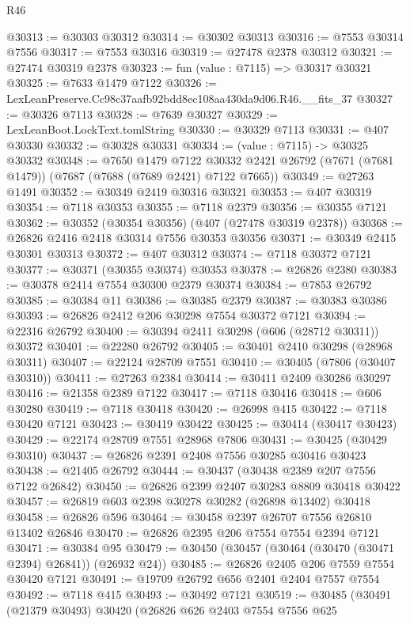 \begin{lexlean}{R46}
\begin{coremodule}
@30313 := @30303 @30312
@30314 := @30302 @30313
@30316 := @7553 @30314 @7556
@30317 := @7553 @30316
@30319 := @27478 @2378 @30312
@30321 := @27474 @30319 @2378
@30323 := fun (value : @7115) => @30317 @30321
@30325 := @7633 @1479 @7122
@30326 := LexLeanPreserve.Cc98c37aafb92bdd8ec108aa430da9d06.R46.__fits_37
@30327 := @30326 @7113
@30328 := @7639 @30327
@30329 := LexLeanBoot.LockText.tomlString
@30330 := @30329 @7113
@30331 := @407 @30330
@30332 := @30328 @30331
@30334 := (value : @7115) -> @30325 @30332
@30348 := @7650
    @1479
    @7122
    @30332
    @2421
    @26792
    (@7671 (@7681 @1479))
    (@7687 (@7688 (@7689 @2421) @7122 @7665))
@30349 := @27263 @1491
@30352 := @30349 @2419 @30316 @30321
@30353 := @407 @30319
@30354 := @7118 @30353
@30355 := @7118 @2379
@30356 := @30355 @7121
@30362 := @30352 (@30354 @30356) (@407 (@27478 @30319 @2378))
@30368 := @26826 @2416 @2418 @30314 @7556 @30353 @30356
@30371 := @30349 @2415 @30301 @30313
@30372 := @407 @30312
@30374 := @7118 @30372 @7121
@30377 := @30371 (@30355 @30374) @30353
@30378 := @26826 @2380
@30383 := @30378 @2414 @7554 @30300 @2379 @30374
@30384 := @7853 @26792
@30385 := @30384 @11
@30386 := @30385 @2379
@30387 := @30383 @30386
@30393 := @26826 @2412 @206 @30298 @7554 @30372 @7121
@30394 := @22316 @26792
@30400 := @30394 @2411 @30298 (@606 (@28712 @30311)) @30372
@30401 := @22280 @26792
@30405 := @30401 @2410 @30298 (@28968 @30311)
@30407 := @22124 @28709 @7551
@30410 := @30405 (@7806 (@30407 @30310))
@30411 := @27263 @2384
@30414 := @30411 @2409 @30286 @30297
@30416 := @21358 @2389 @7122
@30417 := @7118 @30416
@30418 := @606 @30280
@30419 := @7118 @30418
@30420 := @26998 @415
@30422 := @7118 @30420 @7121
@30423 := @30419 @30422
@30425 := @30414 (@30417 @30423)
@30429 := @22174 @28709 @7551 @28968 @7806
@30431 := @30425 (@30429 @30310)
@30437 := @26826 @2391 @2408 @7556 @30285 @30416 @30423
@30438 := @21405 @26792
@30444 := @30437 (@30438 @2389 @207 @7556 @7122 @26842)
@30450 := @26826 @2399 @2407 @30283 @8809 @30418 @30422
@30457 := @26819 @603 @2398 @30278 @30282 (@26898 @13402) @30418
@30458 := @26826 @596
@30464 := @30458 @2397 @26707 @7556 @26810 @13402 @26846
@30470 := @26826 @2395 @206 @7554 @7554 @2394 @7121
@30471 := @30384 @95
@30479 := @30450 (@30457 (@30464 (@30470 (@30471 @2394) @26841)) (@26932 @24))
@30485 := @26826 @2405 @206 @7559 @7554 @30420 @7121
@30491 := @19709 @26792 @656 @2401 @2404 @7557 @7554
@30492 := @7118 @415
@30493 := @30492 @7121
@30519 := @30485
    (@30491
      (@21379 @30493)
      @30420
      (@26826
        @626
        @2403
        @7554
        @7556
        @625

\end{coremodule}
\end{lexlean}
